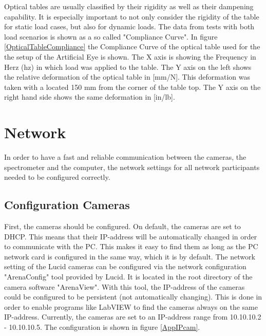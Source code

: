 Optical tables are usually classified by their rigidity as well as their dampening capability. It is especially important to not only consider the rigidity of the table for static load cases, but also for dynamic loads. The data from tests with both load scenarios is shown as a so called "Compliance Curve". In figure \ref{OpticalTableCompliance} the Compliance Curve of the optical table used for the the setup of the Artificial Eye is shown. The X axis is showing the Frequency in Herz (hz) in which load was applied to the table. The Y axis on the left shows the relative deformation of the optical table in [mm/N]. This deformation was taken with a located 150 mm from the corner of the table top. The Y axis on the right hand side shows the same deformation in [in/lb].\cite{LoefflerLang2020}\cite{ThorlabsComplianceOpticalTable}


\section{Network}
In order to have a fast and reliable communication between the cameras, the spectrometer and the computer, the network settings for all network participants needed to be configured correctly. 

\subsection{Configuration Cameras}
First, the cameras should be configured. On default, the cameras are set to DHCP. This means that their IP-address will be automatically changed in order to communicate with the PC. This makes it easy to find them as long as the PC network card is configured in the same way, which it is by default. The network setting of the Lucid cameras can be configured via the network configuration "ArenaConfig" tool provided by Lucid. It is located in the root directory of the camera software "ArenaView". With this tool, the IP-address of the cameras could be configured to be persistent (not automatically changing). This is done in order to enable programs like LabVIEW to find the cameras always on the same IP-address. Currently, the cameras are set to an IP-address range from 10.10.10.2 - 10.10.10.5. The configuration is shown in figure \ref{AppIPcam}.

